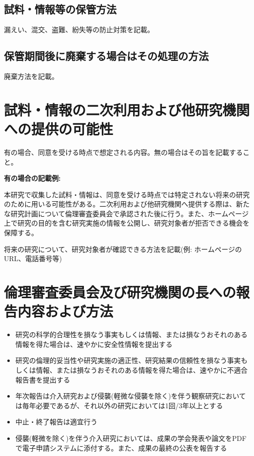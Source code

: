 \documentclass{kyodai-protocol}
\begin{document}
\subsection{試料・情報等の保管方法}

漏えい、混交、盗難、紛失等の防止対策を記載。

\subsection{保管期間後に廃棄する場合はその処理の方法}

廃棄方法を記載。

\section{試料・情報の二次利用および他研究機関への提供の可能性}
\label{sec:secondary-use}

有の場合、同意を受ける時点で想定される内容。無の場合はその旨を記載すること。

\textbf{有の場合の記載例:}

本研究で収集した試料・情報は、同意を受ける時点では特定されない将来の研究のために用いる可能性がある。二次利用および他研究機関へ提供する際は、新たな研究計画について倫理審査委員会で承認された後に行う。また、ホームページ上で研究の目的を含む研究実施の情報を公開し、研究対象者が拒否できる機会を保障する。

将来の研究について、研究対象者が確認できる方法を記載(例: ホームページのURL、電話番号等)

\section{倫理審査委員会及び研究機関の長への報告内容および方法}
\label{sec:reporting}

\begin{itemize}
\item 研究の科学的合理性を損なう事実もしくは情報、または損なうおそれのある情報を得た場合は、速やかに安全性情報を提出する
\item 研究の倫理的妥当性や研究実施の適正性、研究結果の信頼性を損なう事実もしくは情報、または損なうおそれのある情報を得た場合は、速やかに不適合報告書を提出する
\item 年次報告は介入研究および侵襲(軽微な侵襲を除く)を伴う観察研究においては毎年必要であるが、それ以外の研究においては1回/3年以上とする
\item 中止・終了報告は適宜行う
\item 侵襲(軽微を除く)を伴う介入研究においては、成果の学会発表や論文をPDFで電子申請システムに添付する。また、成果の最終の公表を報告する
\end{itemize}
\end{document}
